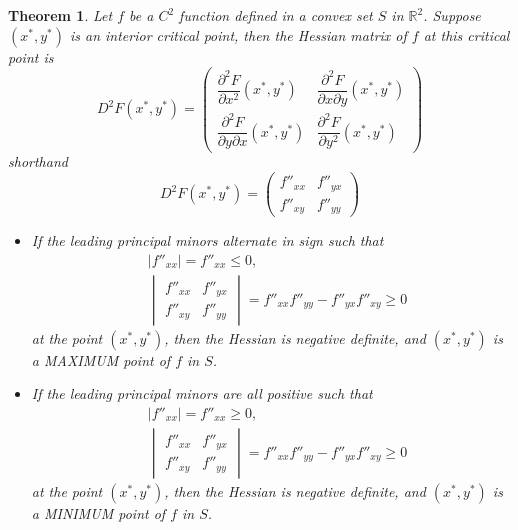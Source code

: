 \documentclass[10pt,a4paper]{book}
\newtheorem{theorem}{Theorem}[section]
\theoremstyle{definition}\newtheorem{definition}{Definition}
\theoremstyle{definition}\newtheorem{fact}{Fact}
\theoremstyle{definition}\newtheorem{ex}{Ex.}
\theoremstyle{definition}\newtheorem{project}{Project}
\theoremstyle{definition}\newtheorem{problem}{Problem}
\theoremstyle{definition}\newtheorem{example}{Example}
\numberwithin{theorem}{chapter}
\numberwithin{corollary}{chapter}
\numberwithin{assumption}{chapter}
\numberwithin{definition}{chapter}
\numberwithin{prop}{chapter}
\numberwithin{notation}{chapter}
\numberwithin{problem}{chapter}
\numberwithin{example}{chapter}
\numberwithin{fact}{chapter}
\numberwithin{ex}{chapter}
\newenvironment{ftheorem}
{\begin{mdframed}\begin{theorem}}
		{\end{theorem}\end{mdframed}}
\def\R{\mathbb R}
\def\R{\mathbb R}
\begin{document}
	\begin{ftheorem}
		Let $f$ be a $C^2$ function defined in a convex set $S$ in $\R^2$. Suppose $(x^*, y^*)$ is an interior critical point, then the Hessian matrix of $f$ at this critical point is
		\begin{equation*}
			D^2 F(x^*, y^*) = 
			\begin{pmatrix}
				\dfrac{\partial^2 F}{\partial x^2} (x^*, y^*)         & \dfrac{\partial^2 F}{\partial x \partial y} (x^*,y^*) \\
				\dfrac{\partial^2 F}{\partial y \partial x} (x^*,y^*) & \dfrac{\partial^2 F}{\partial y^2} (x^*,y^*)          
			\end{pmatrix}
		\end{equation*}
		shorthand
		\begin{equation*}
			D^2 F(x^*, y^*) = 
			\begin{pmatrix}
				f''_{xx} & f''_{yx} \\
				f''_{xy} & f''_{yy} 
			\end{pmatrix}
		\end{equation*}	
		\begin{itemize}
			\item If the leading principal minors alternate in sign such that
			\begin{align*}
				& |f''_{xx}| = f''_{xx}  \leq 0, \\
				& \begin{vmatrix}                                                      
					f''_{xx} & f''_{yx}                                                             \\
					f''_{xy} & f''_{yy}                                                             
				\end{vmatrix} = f''_{xx} f''_{yy} - f''_{yx} f''_{xy} \geq 0
			\end{align*}
			at the point $(x^*, y^*)$, 
			then the Hessian is negative definite, and $(x^*, y^*)$ is a MAXIMUM point of $f$ in $S$.
			\item If the leading principal minors are all positive such that
			\begin{align*}
				& |f''_{xx}| = f''_{xx}  \geq 0,  \\
				& \begin{vmatrix}                                                        
					f''_{xx} & f''_{yx}                                                               \\
					f''_{xy} & f''_{yy}                                                               
				\end{vmatrix} = f''_{xx} f''_{yy} - f''_{yx} f''_{xy} \geq 0
			\end{align*}
			at the point $(x^*, y^*)$, 
			then the Hessian is negative definite, and $(x^*, y^*)$ is a MINIMUM point of $f$ in $S$.
		\end{itemize}
		
	\end{ftheorem}
	
\end{document}
